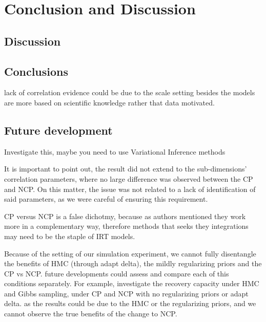 \chapter{Conclusion and Discussion} \label{cap:conclusions}

\section{Discussion}

\section{Conclusions}

lack of correlation evidence could be due to the scale setting
besides the models are more based on scientific knowledge rather that data motivated.

\section{Future development}

Investigate this, maybe you need to use Variational Inference methods

It is important to point out, the result did not extend to the sub-dimensions' correlation parameters, where no large difference was observed between the CP and NCP. On this matter, the issue was not related to a lack of identification of said parameters, as we were careful of ensuring this requirement.

CP versus NCP is a false dichotmy, because as authors mentioned they work more in a complementary way, therefore methods that seeks they integrations may need to be the staple of IRT models.

Because of the setting of our simulation experiment, we cannot fully disentangle the benefits of HMC (through adapt delta), the mildly regularizing priors and the CP vs NCP. future developments could assess and compare each of this conditions separately. For example, investigate the recovery capacity under HMC and Gibbs sampling, under CP and NCP with no regularizing priors or adapt delta. as the results could be due to the HMC or the regularizing priors, and we cannot observe the true benefits of the change to NCP.